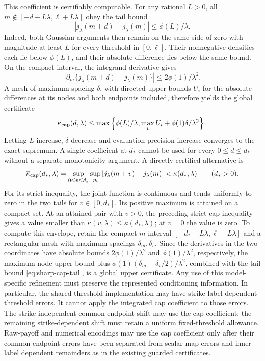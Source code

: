 This coefficient is certifiably computable. For any rational $L>0$, all
$m\notin[-d-L\lambda,\ell+L\lambda]$ obey the tail bound
\begin{equation}
 |j_\lambda(m+d)-j_\lambda(m)|\leq\phi(L)/\lambda.
 \label{eq:sharp-cap-tail}
\end{equation}
Indeed, both Gaussian arguments then remain on the same side of zero
with magnitude at least $L$ for every threshold in $[0,\ell]$.
Their nonnegative densities each lie below $\phi(L)$, and their
absolute difference lies below the same bound. On the compact interval,
the integrand derivative gives
\begin{equation}
 |\partial_m\{j_\lambda(m+d)-j_\lambda(m)\}|
                         \leq2\phi(1)/\lambda^2.
 \label{eq:sharp-cap-mesh-Lipschitz}
\end{equation}
A mesh of maximum spacing $\delta$, with directed upper bounds $U_i$
for the absolute differences at its nodes and both endpoints included,
therefore yields the global certificate
\begin{equation}
 \kappa_{\rm cap}(d,\lambda)
 \leq\max\left\{\phi(L)/\lambda,
                       \max_i U_i+\phi(1)\delta/\lambda^2\right\}.
 \label{eq:sharp-cap-mesh-certificate}
\end{equation}
Letting $L$ increase, $\delta$ decrease and evaluation precision increase
converges to the exact supremum. A single coefficient at $d_*$ cannot be
used for every $0\leq d\leq d_*$ without a separate monotonicity argument.
A directly certified alternative is
\begin{equation}
 \overline\kappa_{\rm cap}(d_*,\lambda)
 =\sup_{0\leq v\leq d_*}\sup_m
                  |j_\lambda(m+v)-j_\lambda(m)|
 <\kappa(d_*,\lambda)\qquad(d_*>0).
 \label{eq:sharp-cap-uniform-gap-envelope}
\end{equation}
For its strict inequality, the joint function is continuous and tends
uniformly to zero in the two tails for $v\in[0,d_*]$. Its positive
maximum is attained on a compact set. At an attained pair with $v>0$,
the preceding strict cap inequality gives a value smaller than
$\kappa(v,\lambda)\leq\kappa(d_*,\lambda)$; at $v=0$ the value is zero.
To compute this envelope, retain the compact $m$ interval
$[-d_*-L\lambda,\ell+L\lambda]$ and a rectangular mesh with maximum
spacings $\delta_m,\delta_v$. Since the derivatives in the two
coordinates have absolute bounds $2\phi(1)/\lambda^2$ and
$\phi(1)/\lambda^2$, respectively, the maximum node upper bound plus
$\phi(1)(\delta_m+\delta_v/2)/\lambda^2$, combined with the tail
bound \eqref{eq:sharp-cap-tail}, is a global upper certificate.
Any use of this model-specific refinement
must preserve the represented conditioning information. In particular,
the shared-threshold implementation may have strike-label dependent
threshold errors. It cannot apply the integrated cap coefficient to
those errors. The strike-independent common endpoint shift may use the
cap coefficient; the remaining strike-dependent shift must retain a
uniform fixed-threshold allowance. Raw-payoff and numerical encodings
may use the cap coefficient only after their common endpoint errors have
been separated from scalar-map errors and inner-label dependent
remainders as in the existing guarded certificates.

